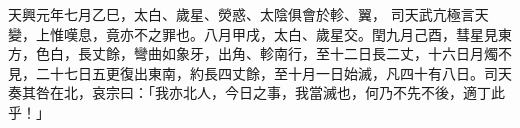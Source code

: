 \begin{pinyinscope}
 天興元年七月乙巳，太白、歲星、熒惑、太陰俱會於軫、翼，
 司天武亢極言天變，上惟嘆息，竟亦不之罪也。八月甲戌，太白、歲星交。閏九月己酉，彗星見東方，色白，長丈餘，彎曲如象牙，出角、軫南行，至十二日長二丈，十六日月燭不見，二十七日五更復出東南，約長四丈餘，至十月一日始滅，凡四十有八日。司天奏其咎在北，哀宗曰：「我亦北人，今日之事，我當滅也，何乃不先不後，適丁此乎！」



\end{pinyinscope}